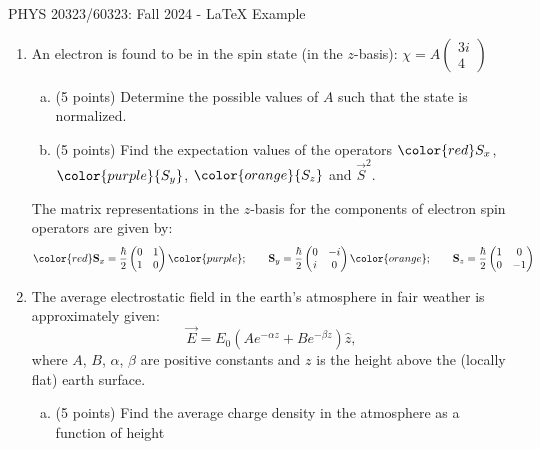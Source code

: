 \documentclass[12pt, a4paper]{article}
\begin{document}
	\begin{center}
		{\Large PHYS 20323/60323: Fall 2024 - LaTeX Example}
	\end{center}
	
	\vspace{0.5cm}
	
	\begin{enumerate}
		\item An electron is found to be in the spin state (in the $z$-basis): $\chi = A\begin{pmatrix} 3i \\ 4 \end{pmatrix}$
		\begin{enumerate}[(a)]
			\item (5 points) Determine the possible values of $A$ such that the state is normalized.
			\item (5 points) Find the expectation values of the operators ${\color{red}S_x}$, $\color{purple}{S_y}$, $\color{orange}{S_z}$ and $\vec{S}^2$.
		\end{enumerate}
		The matrix representations in the $z$-basis for the components of electron spin operators are given by:
		\begin{equation*}
			{\color{red}\textbf{S}_x = \frac{\hbar}{2}
			\begin{pmatrix}
				0 & 1 \\
				1 & 0
			\end{pmatrix}}\,{\color{purple}; \qquad 
			\textbf{S}_y = \frac{\hbar}{2}
			\begin{pmatrix}
				0 & -i \\
				i & 0
			\end{pmatrix}}\,{\color{orange}; \qquad
			\textbf{S}_z = \frac{\hbar}{2}
			\begin{pmatrix}
				1 & 0 \\
				0 & -1
			\end{pmatrix}}
		\end{equation*}
		\item The average electrostatic field in the earth’s atmosphere in fair weather is approximately given:
		\begin{equation}
			\vec{E} = E_0\left(Ae^{-\alpha z} + Be^{-\beta z}\right)\hat{z},
		\end{equation}
		where $A$, $B$, $\alpha$, $\beta$ are positive constants and $z$ is the height above the (locally flat) earth surface.
		\begin{enumerate}[(a)]
			\item (5 points) Find the average charge density in the atmosphere as a function of height

\end{enumerate}
\end{enumerate}
\end{document}
